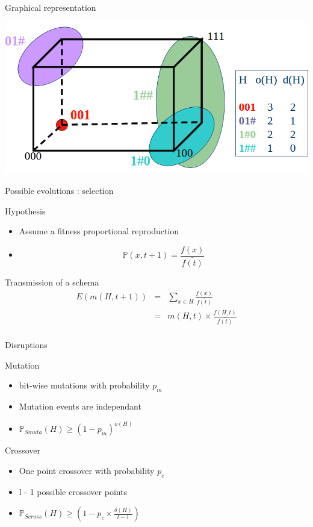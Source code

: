 \begin{frame}{Graphical representation}
  \begin{center}
    \includegraphics[scale=.4]{img/schema}
  \end{center}
\end{frame}

\begin{frame}{Possible evolutions : selection}
  \begin{block}{Hypothesis}
    \begin{itemize}
    \item Assume a fitness proportional reproduction
    \item $$\mathds{P}(x,t+1) = \frac{f(x)}{\bar{f(t)}}$$
    \end{itemize}
  \end{block}

  \begin{block}{Transmission of a schema}
    $$\begin{array}{lll}
      E(m(H,t+1)) & = & \sum\limits_{x \in H} \frac{f(x)}{\bar{f(t)}}\\
      & = & m(H,t) \times \frac{f(H,t)}{\bar{f(t)}}\\
    \end{array}$$
  \end{block}
\end{frame}

\begin{frame}{Disruptions}
  \begin{block}{Mutation}
    \begin{itemize}
    \item bit-wise mutations with probability $p_m$
    \item Mutation events are independant
    \item $\mathds{P}_{Smuta}(H) \geq (1 - p_m)^{o(H)}$
    \end{itemize}
  \end{block}

  \begin{block}{Crossover}
    \begin{itemize}
      \item One point crossover with probability $p_c$
      \item l - 1 possible crossover points
      \item $\mathds{P}_{Scross}(H) \geq (1 - p_c \times \frac{\delta(H)}{l - 1})$
    \end{itemize}
  \end{block}
\end{frame}

